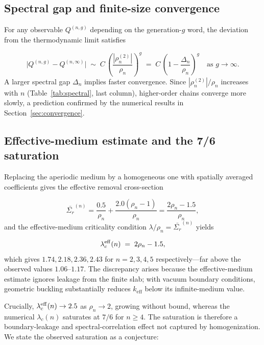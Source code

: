 \documentclass[11pt]{article}
\newcommand{\keff}{k_{\mathrm{eff}}}
\newcommand{\lc}{\lambda_c}
\newcommand{\rhon}{\rho_n}
\newcommand{\Sigmar}{\Sigma_r}
\begin{document}
\subsection{Spectral gap and finite-size convergence}
\label{sec:gap-convergence}

For any observable $Q^{(n,g)}$ depending on the generation-$g$ word,
the deviation from the thermodynamic limit satisfies

\begin{equation}
  \bigl|Q^{(n,g)} - Q^{(n,\infty)}\bigr|
  \;\sim\;
  C\,\left(\frac{|\rho_n^{(2)}|}{\rhon}\right)^g
  \;=\;
  C\,\left(1 - \frac{\Delta_n}{\rhon}\right)^g
  \quad \text{as } g \to \infty.
  \label{eq:convergence-rate}
\end{equation}
A larger spectral gap $\Delta_n$ implies faster convergence.
Since $|\rho_n^{(2)}|/\rhon$ increases with $n$ (Table~\ref{tab:spectral},
last column), higher-order chains converge more slowly, a prediction
confirmed by the numerical results in Section~\ref{sec:convergence}.

\subsection{Effective-medium estimate and the 7/6 saturation}
\label{sec:effective-medium}

Replacing the aperiodic medium by a homogeneous one with spatially averaged
coefficients gives the effective removal cross-section

\begin{equation}
  \bar{\Sigmar}^{(n)}
  = \frac{0.5}{\rhon} + \frac{2.0(\rhon - 1)}{\rhon}
  = \frac{2\rhon - 1.5}{\rhon},
  \label{eq:Sr-eff}
\end{equation}
and the effective-medium criticality condition $\lambda/\rhon = \bar{\Sigmar}^{(n)}$
yields

\begin{equation}
  \lc^{\rm eff}(n) \;=\; 2\rhon - 1.5,
  \label{eq:lc-eff}
\end{equation}
which gives $1.74, 2.18, 2.36, 2.43$ for $n=2,3,4,5$ respectively---far
above the observed values $1.06$--$1.17$.
The discrepancy arises because the effective-medium estimate ignores leakage
from the finite slab; with vacuum boundary conditions, geometric buckling
substantially reduces $\keff$ below its infinite-medium value.

Crucially, $\lc^{\rm eff}(n) \to 2.5$ as $\rhon \to 2$, growing without
bound, whereas the numerical $\lc(n)$ saturates at $7/6$ for $n \geq 4$.
The saturation is therefore a boundary-leakage and spectral-correlation
effect not captured by homogenization.
We state the observed saturation as a conjecture:
\end{document}
